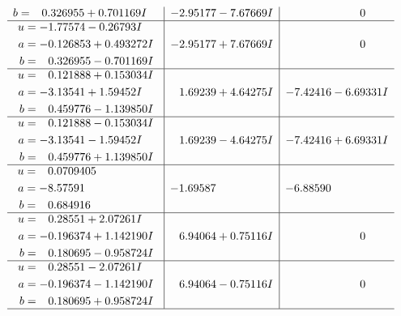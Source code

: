 \documentclass[1p]{elsarticle_modified}
\theoremstyle{definition}
\begin{document}
$$\begin{array}{c|c|c}
\begin{aligned}
b &= \phantom{-}0.326955 + 0.701169 I\end{aligned}
 & -2.95177 - 7.67669 I & \phantom{-0.000000 } 0 \\ \hline\begin{aligned}
u &= -1.77574 - 0.26793 I \\
a &= -0.126853 + 0.493272 I \\
b &= \phantom{-}0.326955 - 0.701169 I\end{aligned}
 & -2.95177 + 7.67669 I & \phantom{-0.000000 } 0 \\ \hline\begin{aligned}
u &= \phantom{-}0.121888 + 0.153034 I \\
a &= -3.13541 + 1.59452 I \\
b &= \phantom{-}0.459776 - 1.139850 I\end{aligned}
 & \phantom{-}1.69239 + 4.64275 I & -7.42416 - 6.69331 I \\ \hline\begin{aligned}
u &= \phantom{-}0.121888 - 0.153034 I \\
a &= -3.13541 - 1.59452 I \\
b &= \phantom{-}0.459776 + 1.139850 I\end{aligned}
 & \phantom{-}1.69239 - 4.64275 I & -7.42416 + 6.69331 I \\ \hline\begin{aligned}
u &= \phantom{-}0.0709405\phantom{ +0.000000I} \\
a &= -8.57591\phantom{ +0.000000I} \\
b &= \phantom{-}0.684916\phantom{ +0.000000I}\end{aligned}
 & -1.69587\phantom{ +0.000000I} & -6.88590\phantom{ +0.000000I} \\ \hline\begin{aligned}
u &= \phantom{-}0.28551 + 2.07261 I \\
a &= -0.196374 + 1.142190 I \\
b &= \phantom{-}0.180695 - 0.958724 I\end{aligned}
 & \phantom{-}6.94064 + 0.75116 I & \phantom{-0.000000 } 0 \\ \hline\begin{aligned}
u &= \phantom{-}0.28551 - 2.07261 I \\
a &= -0.196374 - 1.142190 I \\
b &= \phantom{-}0.180695 + 0.958724 I\end{aligned}
 & \phantom{-}6.94064 - 0.75116 I & \phantom{-0.000000 } 0\\
 \hline 
 \end{array}$$\newpage\newpage\renewcommand{\arraystretch}{1}
\end{document}
